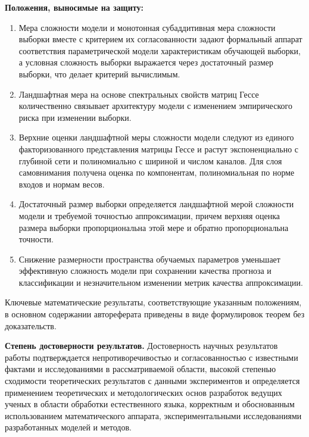 \documentclass{dissert}
\newcommand{\paragraph}[1]{\noindent\textbf{#1}\quad}
\begin{document}
\paragraph{Положения, выносимые на защиту:}
\begin{enumerate}
    \item Мера сложности модели и монотонная субаддитивная мера сложности выборки вместе с критерием их согласованности задают формальный аппарат соответствия параметрической модели характеристикам обучающей выборки, а условная сложность выборки выражается через достаточный размер выборки, что делает критерий вычислимым.
    \item Ландшафтная мера на основе спектральных свойств матриц Гессе количественно связывает архитектуру модели с изменением эмпирического риска при изменении выборки.
    \item Верхние оценки ландшафтной меры сложности модели следуют из единого факторизованного представления матрицы Гессе и растут экспоненциально с глубиной сети и полиномиально с шириной и числом каналов. Для слоя самовнимания получена оценка по компонентам, полиномиальная по норме входов и нормам весов.
    \item Достаточный размер выборки определяется ландшафтной мерой сложности модели и требуемой точностью аппроксимации, причем верхняя оценка размера выборки пропорциональна этой мере и обратно пропорциональна точности.
    \item Снижение размерности пространства обучаемых параметров уменьшает эффективную сложность модели при сохранении качества прогноза и классификации и незначительном изменении метрик качества аппроксимации.
\end{enumerate}
Ключевые математические результаты, соответствующие указанным положениям, в основном содержании автореферата приведены в виде формулировок теорем без доказательств.

\paragraph{Степень достоверности результатов.}
Достоверность научных результатов работы подтверждается непротиворечивостью и согласованностью с известными фактами и исследованиями в рассматриваемой области, высокой степенью сходимости теоретических результатов с данными экспериментов и определяется применением теоретических и методологических основ разработок ведущих ученых в области обработки естественного языка, корректным и обоснованным использованием математического аппарата, экспериментальными исследованиями разработанных моделей и методов.
\end{document}
